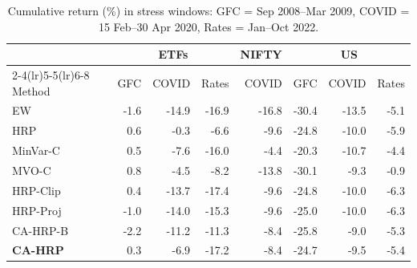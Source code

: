 \begin{table}[!htbp]\centering\small
\caption{Cumulative return (\%) in stress windows: GFC = Sep 2008--Mar 2009, COVID = 15 Feb--30 Apr 2020, Rates = Jan--Oct 2022.}\label{tab:stress}
\setlength{\tabcolsep}{4pt}\begin{tabular}{l rrr r rrr}\toprule
 & \multicolumn{3}{c}{ETFs} & NIFTY & \multicolumn{3}{c}{US}\\
\cmidrule(lr){2-4}\cmidrule(lr){5-5}\cmidrule(lr){6-8}
Method & GFC & COVID & Rates & COVID & GFC & COVID & Rates\\\midrule
EW & -1.6 & -14.9 & -16.9 & -16.8 & -30.4 & -13.5 & -5.1\\
HRP & 0.6 & -0.3 & -6.6 & -9.6 & -24.8 & -10.0 & -5.9\\
MinVar-C & 0.5 & -7.6 & -16.0 & -4.4 & -20.3 & -10.7 & -4.4\\
MVO-C & 0.8 & -4.5 & -8.2 & -13.8 & -30.1 & -9.3 & -0.9\\
HRP-Clip & 0.4 & -13.7 & -17.4 & -9.6 & -24.8 & -10.0 & -6.3\\
HRP-Proj & -1.0 & -14.0 & -15.3 & -9.6 & -25.0 & -10.0 & -6.3\\
CA-HRP-B & -2.2 & -11.2 & -11.3 & -8.4 & -25.8 & -9.0 & -5.3\\
\textbf{CA-HRP} & 0.3 & -6.9 & -17.2 & -8.4 & -24.7 & -9.5 & -5.4\\
\bottomrule\end{tabular}\end{table}